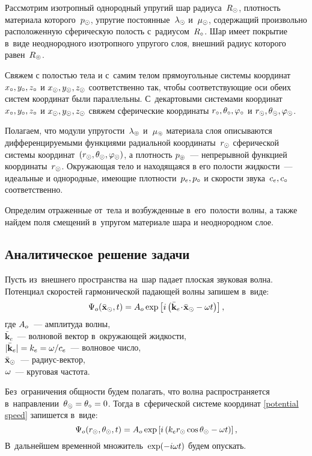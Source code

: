 Рассмотрим изотропный однородный упругий шар радиуса~$R_\odot$, плотность материала которого~$p_\odot$, упругие постоянные~$\lambda_\odot$ и~$\mu_\odot$, содержащий произвольно расположенную сферическую полость с~радиусом~$R_\circ$. Шар имеет покрытие в~виде неоднородного изотропного упругого слоя, внешний радиус которого равен~$R_\circledcirc$.
 
Свяжем с полостью тела и с~самим телом прямоугольные системы координат $x_\circ, y_\circ, z_\circ$ и $x_\odot, y_\odot, z_\odot$ соответственно так, чтобы соответствующие оси обеих систем координат были параллельны. С~декартовыми системами координат $x_\circ, y_\circ, z_\circ$ и $x_\odot, y_\odot, z_\odot$ свяжем сферические координаты $r_\circ, \theta_\circ, \varphi_\circ$ и $r_\odot, \theta_\odot, \varphi_\odot$.

Полагаем, что модули упругости~$\lambda_\circledcirc$ и~$\mu_\circledcirc$ материала слоя описываются дифференцируемыми функциями радиальной координаты~$r_\odot$ сферической системы координат~$(r_\odot, \theta_\odot, \varphi_\odot)$, а плотность $p_\circledcirc$~--- непрерывной функцией координаты~$r_\odot$.  Окружающая тело и находящаяся в его полости жидкости~--- идеальные и однородные, имеющие плотности~$p_e, p_\circ$ и скорости звука~$c_e, c_\circ$ соответственно. 

Определим отраженные от~тела и возбужденные в~его~полости волны, а также найдем поля смещений в~упругом материале шара и неоднородном слое.


\newpage
\subsection{Аналитическое решение задачи}

Пусть из~внешнего пространства на~шар падает плоская звуковая волна. Потенциал скоростей гармонической падающей волны запишем в~виде:
\begin{equation}\label{potential speed}
\Psi_o(\bar{\mathbf{x}}_\odot, t) = A_o \exp\left[i\left(\bar{\mathbf{k}}_e\!\cdot\!\bar{\mathbf{x}}_\odot-\omega t\right)\right],
\end{equation}
где $A_o$~--- амплитуда волны, \\
$\bar{\mathbf{k}}_e$~--- волновой вектор в~окружающей жидкости,  \\
$\lvert\bar{\mathbf{k}}_e\rvert = k_e = \omega / c_e$~--- волновое число, \\
$\bar{\mathbf{x}}_\odot$~--- радиус-вектор, \\
$\omega$~--- круговая частота.

 Без~ограничения общности будем полагать, что волна распространяется в~направлении~$\theta_\odot = \theta_\circ = 0$. Тогда в~сферической системе координат \eqref{potential speed} запишется в~виде:
\begin{equation}
\Psi_o(r_\odot, \theta_\odot, t) = A_o \exp\left[i\left(k_e r_\odot\cos\theta_\odot - \omega t\right)\right],
\end{equation}
В~дальнейшем временной множитель~$\exp(-i\omega t)$ будем опускать.

